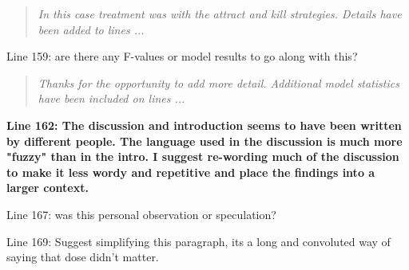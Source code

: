 \documentclass{article}
\begin{document}
\begin{quote}
    \textit{In this case treatment was with the attract and kill strategies.  Details have been added to lines ...}
\end{quote}

Line 159: are there any F-values or model results to go along with this?

\begin{quote}
    \textit{Thanks for the opportunity to add more detail.  Additional model statistics have been included on lines ...}
\end{quote}

\textbf{
Line 162: The discussion and introduction seems to have been written by different people. The language used in the discussion is much more "fuzzy" than in the intro. I suggest re-wording much of the discussion to make it less wordy and repetitive and place the findings into a larger context.
}

Line 167: was this personal observation or speculation?

Line 169: Suggest simplifying this paragraph, its a long and convoluted way of saying that dose didn't matter.
\end{document}
